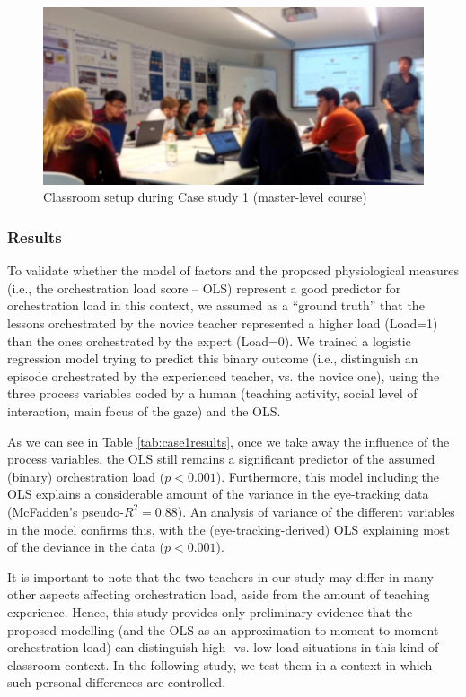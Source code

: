 \documentclass[10pt,journal,compsoc]{IEEEtran}
\begin{document}
\begin{figure}[!t]
\centering
\includegraphics[width=\linewidth]{img/Case1Picture}
\caption{Classroom setup during Case study 1 (master-level course)}
\label{fig:case1picture}
\end{figure}

\subsubsection{Results}

To validate whether the model of factors and the proposed physiological measures (i.e., the orchestration load score -- OLS) represent a good predictor for orchestration load in this context, we assumed as a ``ground truth'' that the lessons orchestrated by the novice teacher represented a higher load (Load=1) than the ones orchestrated by the expert (Load=0). We trained a logistic regression model trying to predict this binary outcome (i.e., distinguish an episode orchestrated by the experienced teacher, vs. the novice one), using the three process variables coded by a human (teaching activity, social level of interaction, main focus of the gaze) and the OLS. 

As we can see in Table \ref{tab:case1results}, once we take away the influence of the process variables, the OLS still remains a significant predictor of the assumed (binary) orchestration load ($p<0.001$). Furthermore, this model including the OLS explains a considerable amount of the variance in the eye-tracking data (McFadden's pseudo-$R^2=0.88$). An analysis of variance of the different variables in the model confirms this, with the (eye-tracking-derived) OLS explaining most of the deviance in the data ($p<0.001$). %

It is important to note that the two teachers in our study may differ in many other aspects affecting orchestration load, aside from the amount of teaching experience. Hence, this study provides only preliminary evidence that the proposed modelling (and the OLS as an approximation to moment-to-moment orchestration load) can distinguish high- vs. low-load situations in this kind of classroom context. In the following study, we test them in a context in which such personal differences are controlled.
\end{document}
